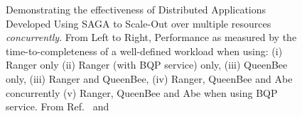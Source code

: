 \documentclass[a4paper,10pt]{article}
\begin{document}
\begin{figure}
\begin{center}
\end{center}
\caption{\small Demonstrating the effectiveness of Distributed Applications Developed  Using SAGA to Scale-Out over multiple resources {\it concurrently}. From Left to Right, Performance as measured by the time-to-completeness of a well-defined workload when using: (i) Ranger only (ii) Ranger (with BQP service) only, (iii) QueenBee only, (iii) Ranger and QueenBee, (iv) Ranger, QueenBee and Abe concurrently (v) Ranger, QueenBee and Abe when using BQP service. From Ref.~\cite{gmac} and ~\cite{saga-ccgrid10}}
\label{fig:results}
\end{figure}
\end{document}

